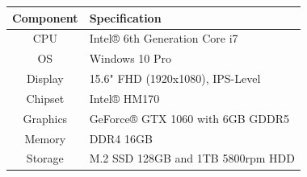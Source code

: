 \documentclass[12pt]{article}
\begin{document}
\begin{longtable}[]{@{}cl@{}}
\toprule
\begin{minipage}[b]{0.21\columnwidth}\centering\strut
Component\strut
\end{minipage} & \begin{minipage}[b]{0.35\columnwidth}\raggedright\strut
Specification\strut
\end{minipage}\tabularnewline
\midrule
\endhead
\begin{minipage}[t]{0.21\columnwidth}\centering\strut
CPU\strut
\end{minipage} & \begin{minipage}[t]{0.35\columnwidth}\raggedright\strut
Intel® 6th Generation Core i7\strut
\end{minipage}\tabularnewline
\begin{minipage}[t]{0.21\columnwidth}\centering\strut
OS\strut
\end{minipage} & \begin{minipage}[t]{0.35\columnwidth}\raggedright\strut
Windows 10 Pro\strut
\end{minipage}\tabularnewline
\begin{minipage}[t]{0.21\columnwidth}\centering\strut
Display\strut
\end{minipage} & \begin{minipage}[t]{0.35\columnwidth}\raggedright\strut
15.6" FHD (1920x1080), IPS-Level\strut
\end{minipage}\tabularnewline
\begin{minipage}[t]{0.21\columnwidth}\centering\strut
Chipset\strut
\end{minipage} & \begin{minipage}[t]{0.35\columnwidth}\raggedright\strut
Intel® HM170\strut
\end{minipage}\tabularnewline
\begin{minipage}[t]{0.21\columnwidth}\centering\strut
Graphics\strut
\end{minipage} & \begin{minipage}[t]{0.35\columnwidth}\raggedright\strut
GeForce® GTX 1060 with 6GB GDDR5\strut
\end{minipage}\tabularnewline
\begin{minipage}[t]{0.21\columnwidth}\centering\strut
Memory\strut
\end{minipage} & \begin{minipage}[t]{0.35\columnwidth}\raggedright\strut
DDR4 16GB\strut
\end{minipage}\tabularnewline
\begin{minipage}[t]{0.21\columnwidth}\centering\strut
Storage\strut
\end{minipage} & \begin{minipage}[t]{0.35\columnwidth}\raggedright\strut
M.2 SSD 128GB and 1TB 5800rpm HDD\strut
\end{minipage}\tabularnewline
\bottomrule
\end{longtable}
\end{document}
